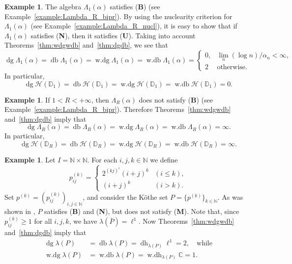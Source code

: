\documentclass[12pt,reqno]{amsart}
\theoremstyle{definition}
\newtheorem{example}[theorem]{Example}
\begin{document}
\begin{example}
The algebra $\Lambda_1(\alpha)$ satisfies {\upshape ({\textbf{B}})}
(see Example~\ref{example:Lambda_R_bipr}). By using the nuclearity criterion
for $\Lambda_1(\alpha)$ (see Example~\ref{example:Lambda_R_nucl}),
it is easy to show that if $\Lambda_1(\alpha)$ satisfies
{\upshape ({\textbf{N}})}, then it satisfies ({\textbf{U}}).
Taking into account Theorems~\ref{thm:wdgwdb}
and~\ref{thm:dgdb}, we see that
\[
{\mathop{\mathrm{dg}}}\Lambda_1(\alpha)={\mathop{\mathrm{db}}}\Lambda_1(\alpha)
={\mathop{\mathrm{w.dg}}}\Lambda_1(\alpha)={\mathop{\mathrm{w.db}}}\Lambda_1(\alpha)=
\begin{cases}
0, &  \lim_n (\log n)/\alpha_n<\infty,\\
2 & \text{otherwise.}
\end{cases}
\]
In particular,
\[
{\mathop{\mathrm{dg}}} {\mathscr H}({\mathbb D}_1)={\mathop{\mathrm{db}}} {\mathscr H}({\mathbb D}_1)={\mathop{\mathrm{w.dg}}} {\mathscr H}({\mathbb D}_1)={\mathop{\mathrm{w.db}}} {\mathscr H}({\mathbb D}_1)=0.
\]
\end{example}

\begin{example}
If $1<R<+\infty$, then $\Lambda_R(\alpha)$ does not satisfy ({\textbf{B}})
(see Example~\ref{example:Lambda_R_bipr}). Therefore Theorems~\ref{thm:wdgwdb}
and~\ref{thm:dgdb} imply that
\[
{\mathop{\mathrm{dg}}}\Lambda_R(\alpha)={\mathop{\mathrm{db}}}\Lambda_R(\alpha)
={\mathop{\mathrm{w.dg}}}\Lambda_R(\alpha)={\mathop{\mathrm{w.db}}}\Lambda_R(\alpha)=\infty.
\]
In particular,
\[
{\mathop{\mathrm{dg}}} {\mathscr H}({\mathbb D}_R)={\mathop{\mathrm{db}}} {\mathscr H}({\mathbb D}_R)={\mathop{\mathrm{w.dg}}} {\mathscr H}({\mathbb D}_R)={\mathop{\mathrm{w.db}}} {\mathscr H}({\mathbb D}_R)=\infty.
\]
\end{example}

\begin{example}
Let $I={\mathbb N}\times{\mathbb N}$. For each $i,j,k\in{\mathbb N}$ we define
\[
p_{ij}^{(k)}=
\begin{cases}
2^{(kj)^i} (i+j)^k & (i\le k),\\
(i+j)^k & (i>k).
\end{cases}
\]
Set $p^{(k)}=(p_{ij}^{(k)})_{i,j\in{\mathbb N}}$, and consider the K\"othe set
$P=\{ p^{(k)}\}_{k\in{\mathbb N}}$. As was shown in \cite[Theorem 7.9]{Pir_msb},
$P$ satisfies {\upshape ({\textbf{B}})} and {\upshape ({\textbf{N}})},
but does not satisfy {\upshape ({\textbf{M}})}.
Note that, since $p_{ij}^{(k)}\ge 1$ for all $i,j,k$, we have $\lambda(\bar P)=\ell^1$.
Now Theorems~\ref{thm:wdgwdb}
and~\ref{thm:dgdb} imply that
\begin{align*}
{\mathop{\mathrm{dg}}}\lambda(P)&={\mathop{\mathrm{db}}}\lambda(P)={\mathop{\mathrm{dh}}}\nolimits_{\lambda(P)}\ell^1=2, \quad\text{while}\\
{\mathop{\mathrm{w.dg}}}\lambda(P)&={\mathop{\mathrm{w.db}}}\lambda(P)={\mathop{\mathrm{w.dh}}}\nolimits_{\lambda(P)}{\mathbb C}=1.
\end{align*}
\end{example}
\end{document}
